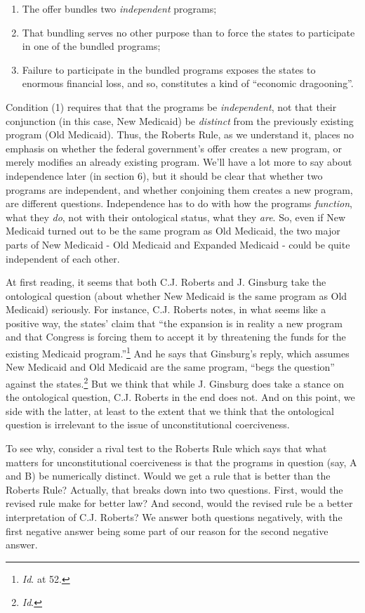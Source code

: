 \begin{enumerate}
\item The offer bundles two \emph{independent} programs;

\item That bundling serves no other purpose than to force the states to participate in one of the bundled programs;

\item Failure to participate in the bundled programs exposes the states to enormous financial loss, and so, constitutes a kind of ``economic dragooning''.

\end{enumerate}
Condition (1) requires that that the programs be \emph{independent}, not that their conjunction (in this case, New Medicaid) be \emph{distinct }from the previously existing program (Old Medicaid). Thus, the Roberts Rule, as we understand it, places no emphasis on whether the federal government's offer creates a new program, or merely modifies an already existing program. We'll have a lot more to say about independence later (in section 6), but it should be clear that whether two programs are independent, and whether conjoining them creates a new program, are different questions. Independence has to do with how the programs \emph{function}, what they \emph{do}, not with their ontological status, what they \emph{are}. So, even if New Medicaid turned out to be the same program as Old Medicaid, the two major parts of New Medicaid - Old Medicaid and Expanded Medicaid - could be quite independent of each other. 

At first reading, it seems that both C.J. Roberts and J. Ginsburg take the ontological question (about whether New Medicaid is the same program as Old Medicaid) seriously. For instance, C.J. Roberts notes, in what seems like a positive way, the states' claim that ``the expansion is in reality a new program and that Congress is forcing them to accept it by threatening the funds for the existing Medicaid program.''\footnote{\emph{Id}. at 52.} And he says that Ginsburg's reply, which assumes New Medicaid and Old Medicaid are the same program, ``begs the question'' against the states.\footnote{\emph{Id}.} But we think that while J. Ginsburg does take a stance on the ontological question, C.J. Roberts in the end does not. And on this point, we side with the latter, at least to the extent that we think that the ontological question is irrelevant to the issue of unconstitutional coerciveness. 

To see why, consider a rival test to the Roberts Rule which says that what matters for unconstitutional coerciveness is that the programs in question (say, A and B) be numerically distinct. Would we get a rule that is better than the Roberts Rule? Actually, that breaks down into two questions. First, would the revised rule make for better law? And second, would the revised rule be a better interpretation of C.J. Roberts? We answer both questions negatively, with the first negative answer being some part of our reason for the second negative answer.

